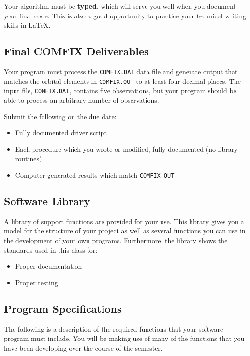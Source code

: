 \documentclass[11pt, reqno]{article}    %
\begin{document}
Your algorithm must be \textbf{typed}, which will serve you well when you document your final code. 
This is also a good opportunity to practice your technical writing skills in \LaTeX.

\subsection*{Final COMFIX Deliverables}

Your program must process the \texttt{COMFIX.DAT} data file and generate output that matches the orbital elements in \texttt{COMFIX.OUT} to at least four decimal places. 
The input file, \texttt{COMFIX.DAT}, contains five observations, but your program should be able to process an arbitrary number of observations.

Submit the following on the due date:
\begin{itemize}
    \item Fully documented driver script
    \item Each procedure which you wrote or modified, fully documented (no library routines)
    \item Computer generated results which match \texttt{COMFIX.OUT}
\end{itemize}

\subsection*{Software Library}

A library of support functions are provided for your use. 
This library gives you a model for the structure of your project as well as several functions you can use in the development of your own programs.
Furthermore, the library shows the standards used in this class for:
\begin{itemize}
    \item Proper documentation
    \item Proper testing
\end{itemize}

\subsection*{Program Specifications}

The following is a description of the required functions that your software program must include. 
You will be making use of many of the functions that you have been developing over the course of the semester.
\end{document}
